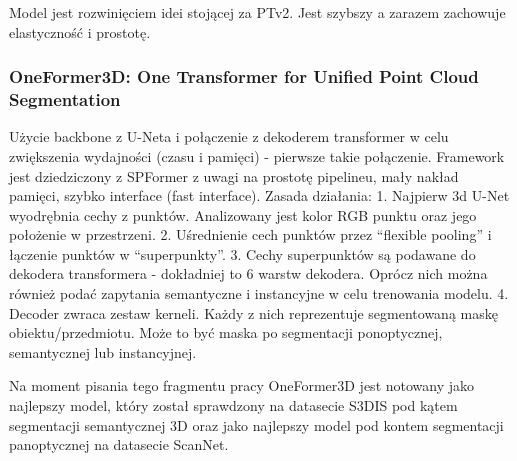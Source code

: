 \documentclass[
]{article}
\begin{document}
Model jest rozwinięciem idei stojącej za PTv2. Jest szybszy a zarazem zachowuje elastyczność i prostotę.

\subsubsection{OneFormer3D: One Transformer for Unified Point Cloud Segmentation}\label{oneformer3d-one-transformer-for-unified-point-cloud-segmentation}

Użycie backbone z U-Neta i połączenie z dekoderem transformer w celu zwiększenia wydajności (czasu i pamięci) - pierwsze takie połączenie.
Framework jest dziedziczony z SPFormer z uwagi na prostotę pipelineu, mały nakład pamięci, szybko interface (fast interface).
Zasada działania:
1. Najpierw 3d U-Net wyodrębnia cechy z punktów. Analizowany jest kolor RGB punktu oraz jego położenie w przestrzeni.
2. Uśrednienie cech punktów przez ``flexible pooling'' i łączenie punktów w ``superpunkty''.
3. Cechy superpunktów są podawane do dekodera transformera - dokładniej to 6 warstw dekodera. Oprócz nich można również podać zapytania semantyczne i instancyjne w celu trenowania modelu.
4. Decoder zwraca zestaw kerneli. Każdy z nich reprezentuje segmentowaną maskę obiektu/przedmiotu. Może to być maska po segmentacji ponoptycznej, semantycznej lub instancyjnej.

Na moment pisania tego fragmentu pracy OneFormer3D jest notowany jako najlepszy model, który został sprawdzony na datasecie S3DIS pod kątem segmentacji semantycznej 3D oraz jako najlepszy model pod kontem segmentacji panoptycznej na datasecie ScanNet.
\end{document}
